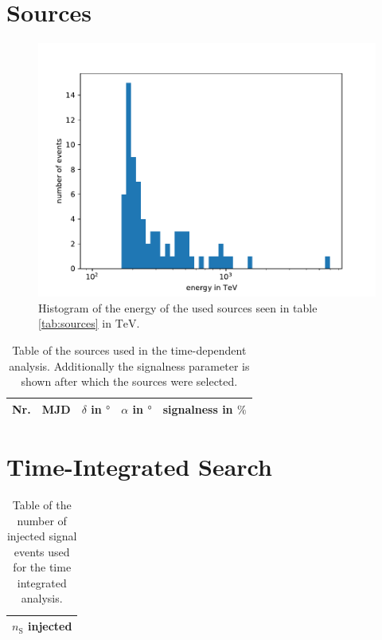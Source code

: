 \section{Sources}

\begin{figure}
    \centering
    \includegraphics[width=\linewidth]{Plots/appendix/sources_energy.pdf}
    \caption{Histogram of the energy of the used sources seen in table \ref{tab:sources} in $\si{\tera\electronvolt}$.}
    \label{fig:sources_energy}
\end{figure}

\begin{table}
  \centering
  \caption{Table of the sources used in the time-dependent analysis. Additionally the signalness parameter is shown after which the sources were selected.}
  \label{tab:sources_time_dep}
  \begin{tabular}{ccrrc}
    \toprule
    Nr. & MJD &  $\delta$ in $\si{\degree}$ & $\alpha$ in $\si{\degree}$ & signalness in $\si{\percent}$ \\
    \toprule
      
    \toprule
  \end{tabular}
\end{table}

\section{Time-Integrated Search}

\begin{table}
  \centering
  \caption{Table of the number of injected signal events used for the time integrated analysis.}
  \label{tab:sig_time_int_table}
  \begin{tabular}{r}
    \toprule
    $n_\text{S}$ injected \\
    \toprule
      
    \toprule
  \end{tabular}
\end{table}

